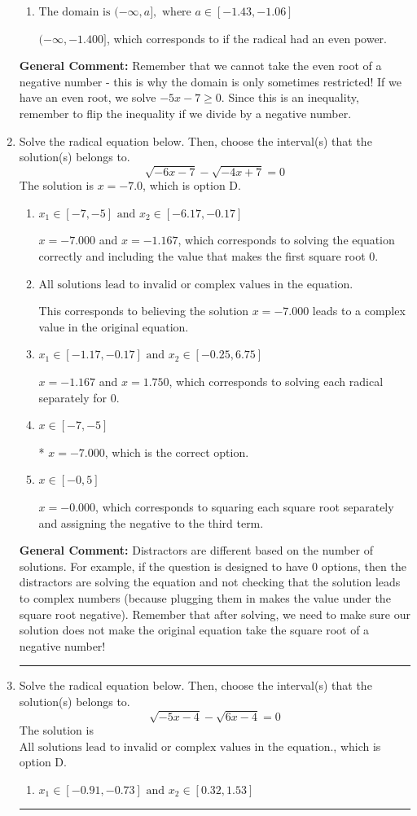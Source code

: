 \documentclass{extbook}[14pt]
\newcommand{\litem}[1]{\item #1

\rule{\textwidth}{0.4pt}}
\begin{document}
\begin{enumerate}
{\begin{enumerate}[label=\Alph*.]
* This is the correct option since the radical has an odd power.
\item \( \text{The domain is } (-\infty, a], \text{   where } a \in [-1.43, -1.06] \)

$(-\infty, -1.400]$, which corresponds to if the radical had an even power.
\end{enumerate}

\textbf{General Comment:} Remember that we cannot take the even root of a negative number - this is why the domain is only sometimes restricted! If we have an even root, we solve $-5 x - 7 \geq 0$. Since this is an inequality, remember to flip the inequality if we divide by a negative number.
}
\litem{
Solve the radical equation below. Then, choose the interval(s) that the solution(s) belongs to.
\[ \sqrt{-6 x - 7} - \sqrt{-4 x + 7} = 0 \]The solution is \( x = -7.0 \), which is option D.\begin{enumerate}[label=\Alph*.]
\item \( x_1 \in [-7, -5] \text{ and } x_2 \in [-6.17,-0.17] \)

$x = -7.000$ and $x = -1.167$, which corresponds to solving the equation correctly and including the value that makes the first square root 0.
\item \( \text{All solutions lead to invalid or complex values in the equation.} \)

This corresponds to believing the solution $x = -7.000$ leads to a complex value in the original equation.
\item \( x_1 \in [-1.17, -0.17] \text{ and } x_2 \in [-0.25,6.75] \)

$x = -1.167$ and $x = 1.750$, which corresponds to solving each radical separately for 0.
\item \( x \in [-7,-5] \)

* $x = -7.000$, which is the correct option.
\item \( x \in [-0,5] \)

$x = -0.000$, which corresponds to squaring each square root separately and assigning the negative to the third term.
\end{enumerate}

\textbf{General Comment:} Distractors are different based on the number of solutions. For example, if the question is designed to have 0 options, then the distractors are solving the equation and not checking that the solution leads to complex numbers (because plugging them in makes the value under the square root negative). Remember that after solving, we need to make sure our solution does not make the original equation take the square root of a negative number!
}
\litem{
Solve the radical equation below. Then, choose the interval(s) that the solution(s) belongs to.
\[ \sqrt{-5 x - 4} - \sqrt{6 x - 4} = 0 \]The solution is \( \text{All solutions lead to invalid or complex values in the equation.} \), which is option D.\begin{enumerate}[label=\Alph*.]
\item \( x_1 \in [-0.91, -0.73] \text{ and } x_2 \in [0.32,1.53] \)


\end{enumerate}}
\end{enumerate}
\end{document}
